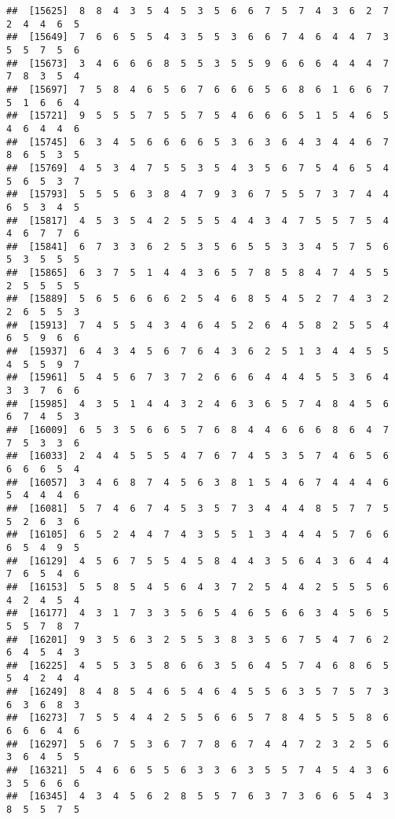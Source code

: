 \documentclass[
]{book}
\begin{document}
\begin{verbatim}
##  [15625]  8  8  4  3  5  4  5  3  5  6  6  7  5  7  4  3  6  2  7  2  4  4  6  5
##  [15649]  7  6  6  5  5  4  3  5  5  3  6  6  7  4  6  4  4  7  3  5  5  7  5  6
##  [15673]  3  4  6  6  6  8  5  5  3  5  5  9  6  6  6  4  4  4  7  7  8  3  5  4
##  [15697]  7  5  8  4  6  5  6  7  6  6  6  5  6  8  6  1  6  6  7  5  1  6  6  4
##  [15721]  9  5  5  5  7  5  5  7  5  4  6  6  6  5  1  5  4  6  5  4  6  4  4  6
##  [15745]  6  3  4  5  6  6  6  6  5  3  6  3  6  4  3  4  4  6  7  8  6  5  3  5
##  [15769]  4  5  3  4  7  5  5  3  5  4  3  5  6  7  5  4  6  5  4  5  6  5  3  7
##  [15793]  5  5  5  6  3  8  4  7  9  3  6  7  5  5  7  3  7  4  4  6  5  3  4  5
##  [15817]  4  5  3  5  4  2  5  5  5  4  4  3  4  7  5  5  7  5  4  4  6  7  7  6
##  [15841]  6  7  3  3  6  2  5  3  5  6  5  5  3  3  4  5  7  5  6  5  3  5  5  5
##  [15865]  6  3  7  5  1  4  4  3  6  5  7  8  5  8  4  7  4  5  5  2  5  5  5  5
##  [15889]  5  6  5  6  6  6  2  5  4  6  8  5  4  5  2  7  4  3  2  2  6  5  5  3
##  [15913]  7  4  5  5  4  3  4  6  4  5  2  6  4  5  8  2  5  5  4  6  5  9  6  6
##  [15937]  6  4  3  4  5  6  7  6  4  3  6  2  5  1  3  4  4  5  5  4  5  5  9  7
##  [15961]  5  4  5  6  7  3  7  2  6  6  6  4  4  4  5  5  3  6  4  3  3  7  6  6
##  [15985]  4  3  5  1  4  4  3  2  4  6  3  6  5  7  4  8  4  5  6  6  7  4  5  3
##  [16009]  6  5  3  5  6  6  5  7  6  8  4  4  6  6  6  8  6  4  7  7  5  3  3  6
##  [16033]  2  4  4  5  5  5  4  7  6  7  4  5  3  5  7  4  6  5  6  6  6  6  5  4
##  [16057]  3  4  6  8  7  4  5  6  3  8  1  5  4  6  7  4  4  4  6  5  4  4  4  6
##  [16081]  5  7  4  6  7  4  5  3  5  7  3  4  4  4  8  5  7  7  5  5  2  6  3  6
##  [16105]  6  5  2  4  4  7  4  3  5  5  1  3  4  4  4  5  7  6  6  6  5  4  9  5
##  [16129]  4  5  6  7  5  5  4  5  8  4  4  3  5  6  4  3  6  4  4  7  6  5  4  6
##  [16153]  5  5  8  5  4  5  6  4  3  7  2  5  4  4  2  5  5  5  6  4  2  4  5  4
##  [16177]  4  3  1  7  3  3  5  6  5  4  6  5  6  6  3  4  5  6  5  5  5  7  8  7
##  [16201]  9  3  5  6  3  2  5  5  3  8  3  5  6  7  5  4  7  6  2  6  4  5  4  3
##  [16225]  4  5  5  3  5  8  6  6  3  5  6  4  5  7  4  6  8  6  5  5  4  2  4  4
##  [16249]  8  4  8  5  4  6  5  4  6  4  5  5  6  3  5  7  5  7  3  6  3  6  8  3
##  [16273]  7  5  5  4  4  2  5  5  6  6  5  7  8  4  5  5  5  8  6  6  6  6  4  6
##  [16297]  5  6  7  5  3  6  7  7  8  6  7  4  4  7  2  3  2  5  6  3  6  4  5  5
##  [16321]  5  4  6  6  5  5  6  3  3  6  3  5  5  7  4  5  4  3  6  3  5  6  6  6
##  [16345]  4  3  4  5  6  2  8  5  5  7  6  3  7  3  6  6  5  4  3  8  5  5  7  5

\end{verbatim}
\end{document}
